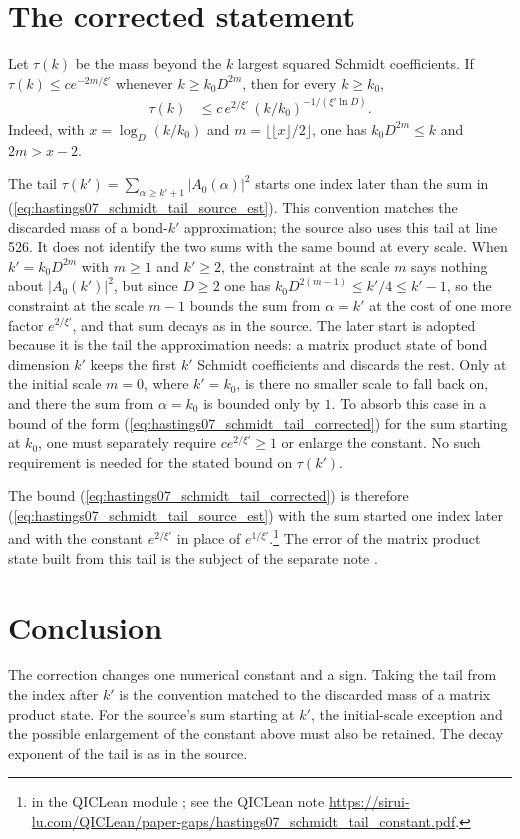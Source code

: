 \documentclass{article}
\begin{document}
\section{The corrected statement}

Let $\tau(k)$ be the mass beyond the $k$ largest squared Schmidt coefficients.
If $\tau(k)\le ce^{-2m/\xi'}$ whenever $k\ge k_0D^{2m}$, then for every
$k\ge k_0$,
\begin{align}
    \tau(k)
     & \le c\,e^{2/\xi'}\,(k/k_0)^{-1/(\xi'\ln D)}.
    \label{eq:hastings07_schmidt_tail_corrected}
\end{align}
Indeed, with $x=\log_D(k/k_0)$ and $m=\lfloor\lfloor x\rfloor/2\rfloor$, one
has $k_0D^{2m}\le k$ and $2m>x-2$.

The tail $\tau(k')=\sum_{\alpha\ge k'+1}|A_0(\alpha)|^2$ starts one index
later than the sum in (\ref{eq:hastings07_schmidt_tail_source_est}). This
convention matches the discarded mass of a bond-$k'$ approximation; the
source also uses this tail at line 526. It does not identify the two sums
with the same bound at every scale. When
$k'=k_0D^{2m}$ with $m\ge1$ and $k'\ge2$, the constraint at the scale $m$ says
nothing about $|A_0(k')|^2$, but since $D\ge2$ one has
$k_0D^{2(m-1)}\le k'/4\le k'-1$, so the constraint at the scale $m-1$ bounds
the sum from $\alpha=k'$ at the cost of one more factor $e^{2/\xi'}$, and that
sum decays as in the source. The later start is adopted because it is the tail
the approximation needs: a matrix product state of bond dimension $k'$ keeps
the first $k'$ Schmidt coefficients and discards the rest. Only at the initial
scale $m=0$, where $k'=k_0$, is there no smaller scale to fall back on, and
there the sum from $\alpha=k_0$ is bounded only by $1$. To absorb this case
in a bound of the form (\ref{eq:hastings07_schmidt_tail_corrected}) for the
sum starting at $k_0$, one must separately require $ce^{2/\xi'}\ge1$ or
enlarge the constant. No such requirement is needed for the stated bound
on $\tau(k')$.

The bound (\ref{eq:hastings07_schmidt_tail_corrected}) is therefore
(\ref{eq:hastings07_schmidt_tail_source_est}) with the sum started one index
later and with the constant $e^{2/\xi'}$ in place of
$e^{1/\xi'}$.\footnote{
    in the QICLean module ; see the QICLean note
    \url{https://sirui-lu.com/QICLean/paper-gaps/hastings07_schmidt_tail_constant.pdf}.}
The error of the matrix product state built from this tail is the subject of
the separate note .

\section{Conclusion}

The correction changes one numerical constant and a sign. Taking the tail from
the index after $k'$ is the convention matched to the discarded mass of a
matrix product state. For the source's sum starting at $k'$, the
initial-scale exception and the possible enlargement of the constant above
must also be retained. The decay exponent of the tail is as in the source.



\end{document}
